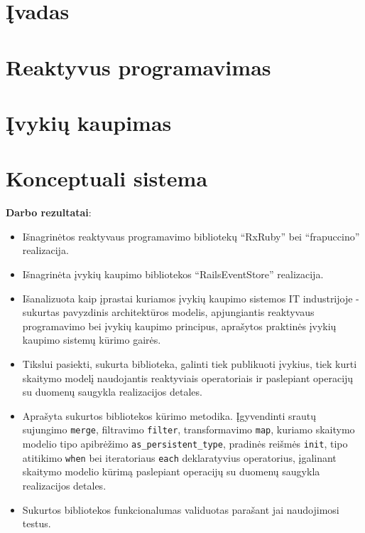 \documentclass{VUMIFPSmagistrinis}
\begin{document}

\tableofcontents

\section{Įvadas}


\section{Reaktyvus programavimas}


\section{Įvykių kaupimas}


\section{Konceptuali sistema}



\textbf{Darbo rezultatai}:

\begin{itemize}
  \item Išnagrinėtos reaktyvaus programavimo bibliotekų ``RxRuby'' bei ``frapuccino'' realizacija.
  \item Išnagrinėta įvykių kaupimo bibliotekos ``RailsEventStore'' realizacija.
  \item Išanalizuota kaip įprastai kuriamos įvykių kaupimo sistemos IT industrijoje - sukurtas pavyzdinis architektūros modelis, apjungiantis reaktyvaus programavimo bei įvykių kaupimo principus, aprašytos praktinės įvykių kaupimo sistemų kūrimo gairės.
  \item Tikslui pasiekti, sukurta biblioteka, galinti tiek publikuoti įvykius, tiek kurti skaitymo modelį naudojantis reaktyviais operatoriais ir paslepiant operacijų su duomenų saugykla realizacijos detales.
  \item Aprašyta sukurtos bibliotekos kūrimo metodika. Įgyvendinti srautų sujungimo \lstinline|merge|, filtravimo \lstinline|filter|, transformavimo \lstinline|map|, kuriamo skaitymo modelio tipo apibrėžimo \lstinline|as_persistent_type|, pradinės reišmės \lstinline|init|, tipo atitikimo \lstinline|when| bei iteratoriaus \lstinline|each| deklaratyvius operatorius, įgalinant skaitymo modelio kūrimą paslepiant operacijų su duomenų saugykla realizacijos detales.
  \item Sukurtos bibliotekos funkcionalumas validuotas parašant jai naudojimosi testus.
\end{itemize}
\end{document}
